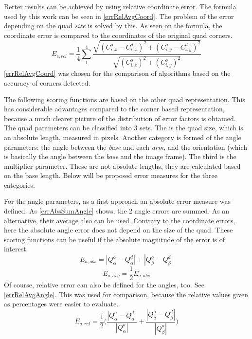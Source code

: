 Better results can be achieved by using relative coordinate error.
The formula used by this work can be seen in \eqref{errRelAvgCoord}.
The problem of the error depending on the quad \textit{size} is solved by this.
As seen on the formula, the coordinate error is compared to the coordinates of the original quad corners.
\begin{equation}
E_{c,rel} = \frac{1}{4}\sum_{1}^{4} \frac{\sqrt{(C_{i,x}^o - C_{i,x}^d)^2 + (C_{i,y}^o - C_{i,y}^d)^2}}{\sqrt{(C_{i,x}^o)^2 + (C_{i,y}^o)^2}}
\label{eq:errRelAvgCoord}
\end{equation}
\eqref{errRelAvgCoord} was chosen for the comparison of algorithms based on the accuracy of corners detected.

The following scoring functions are based on the other quad representation.
This has considerable advantages compared to the corner based representation, because a much clearer picture of the distribution of error factors is obtained.
The quad parameters can be classified into 3 sets.
The is the quad size, which is an absolute length, measured in pixels.
Another category is formed of the angle parameters: the angle between the \textit{base} and each \textit{arm}, and the orientation (which is basically the angle between the \textit{base} and the image frame).
The third is the multiplier parameter.
These are not absolute lengths, they are calculated based on the base length.
Below will be proposed error measures for the three categories.

For the angle parameters, as a first approach an absolute error measure was defined.
As \eqref{errAbsSumAngle} shows, the 2 angle errors are summed.
As an alternative, their average also can be used.
Contrary to the coordinate errors, here the absolute angle error does not depend on the size of the quad.
These scoring functions can be useful if the absolute magnitude of the error is of interest.
\begin{equation}
E_{a,abs} = |Q_\alpha^o - Q_\alpha^d| + |Q_\beta^o - Q_\beta^d|
\label{eq:errAbsSumAngle}
\end{equation}
\begin{equation}
E_{a,avg} = \frac{1}{2} E_{a,abs}
\label{eq:errAbsAvgAngle}
\end{equation}
Of course, relative error can also be defined for the angles, too.
See \eqref{errRelAvgAngle}.
This was used for comparison, because the relative values given as percentages were easier to evaluate.
\begin{equation}
E_{a,rel} = \frac{1}{2}\Bigg(\frac{|Q_\alpha^o - Q_\alpha^d|}{|Q_\alpha^o|} + \frac{|Q_\beta^o - Q_\beta^d|}{|Q_\beta^o|}\Bigg)
\label{eq:errRelAvgAngle}
\end{equation}

